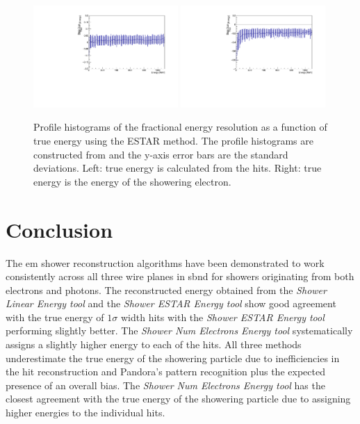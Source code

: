\begin{figure}[h!]
    \centering
    \includegraphics[width = 0.49\textwidth]{figures-chap4/frac_res_vs_energy_cheating_electron_vertex_plane2_ESTAR_profile.pdf}
    \includegraphics[width = 0.49\textwidth]{figures-chap4/frac_res_vs_energy_cheating_electron_vertex_plane2_ESTAR_showeringE_profile.pdf}
    \caption[Profile histograms of the fractional energy resolution as a function of true energy.]{Profile histograms of the fractional energy resolution as a function of true energy using the ESTAR method. The profile histograms are constructed from  and the y-axis error bars are the standard deviations.  Left: true energy is calculated from the hits. Right: true energy is the energy of the showering electron.}
    \label{fig:reconstruction_as_a_function_of_energy_profile}
\end{figure}



\newpage

\section{Conclusion}

The \gls{em} shower reconstruction algorithms have been demonstrated to work consistently across all three wire planes in \gls{sbnd} for showers originating from both electrons and photons. The reconstructed energy obtained from the \textit{Shower Linear Energy tool} and the \textit{Shower ESTAR Energy tool} show good agreement with the true energy of $1 \sigma$ width hits with the \textit{Shower ESTAR Energy tool} performing slightly better. The \textit{Shower Num Electrons Energy tool} systematically assigns a slightly higher energy to each of the hits. All three methods underestimate the true energy of the showering particle due to inefficiencies in the hit reconstruction and Pandora's pattern recognition plus the expected presence of an overall bias. The \textit{Shower Num Electrons Energy tool} has the closest agreement with the true energy of the showering particle due to assigning higher energies to the individual hits.

